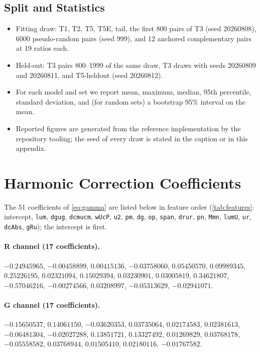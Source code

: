 \subsection{Split and Statistics}
\begin{itemize}
\item Fitting draw: T1, T2, T5, T5E, tail, the first 800 pairs of T3 (seed 20260808), 6000 pseudo-random pairs (seed 999), and 12 anchored complementary pairs at 19 ratios each.
\item Held-out: T3 pairs 800--1999 of the same draw, T3 draws with seeds 20260809 and 20260811, and T5-heldout (seed 20260812).
\item For each model and set we report mean, maximum, median, 95th percentile, standard deviation, and (for random sets) a bootstrap 95\% interval on the mean.
\item Reported figures are generated from the reference implementation by the repository tooling; the seed of every draw is stated in the caption or in this appendix.
\end{itemize}

\section{Harmonic Correction Coefficients}
\label{app:coeff}

The 51 coefficients of \cref{eq:gamma} are listed below in feature order (\cref{tab:features}: intercept, \texttt{lum}, \texttt{dgug}, \texttt{dcmucm}, \texttt{wUcP}, \texttt{u2}, \texttt{pm}, \texttt{dg}, \texttt{op}, \texttt{span}, \texttt{drur}, \texttt{pn}, \texttt{Mmn}, \texttt{lumU}, \texttt{ur}, \texttt{dcAbs}, \texttt{gRu}); the intercept is first.

\paragraph{R channel (17 coefficients).}
$-0.24945965$, $-0.00458899$, $0.00415136$, $-0.03758060$, $0.05450570$, $0.09989345$, $0.25226195$, $0.02321094$, $0.15029394$, $0.03230901$, $0.03005819$, $0.34621807$, $-0.57046216$, $-0.00274566$, $0.03208997$, $-0.05313629$, $-0.02941071$.

\paragraph{G channel (17 coefficients).}
$-0.15650537$, $0.14061150$, $-0.03620353$, $0.03735064$, $0.02174583$, $0.02381613$, $-0.06481304$, $-0.02027288$, $0.13851721$, $0.13327492$, $0.01269829$, $0.03768178$, $-0.05558582$, $0.03768944$, $0.01505410$, $0.02180116$, $-0.01767582$.

